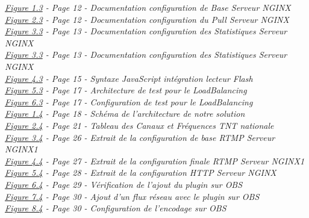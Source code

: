 \documentclass{report}
\begin{document}
\textit{\underline{Figure 1.3} - Page 12 - Documentation configuration de Base Serveur NGINX}
\\


\textit{\underline{Figure 2.3} - Page 12 - Documentation configuration du Pull Serveur NGINX}
\\


\textit{\underline{Figure 3.3} - Page 13 - Documentation configuration des Statistiques Serveur NGINX}
\\

\textit{\underline{Figure 3.3} - Page 13 - Documentation configuration des Statistiques Serveur NGINX}
\\

\textit{\underline{Figure 4.3} - Page 15 - Syntaxe JavaScript intégration lecteur Flash}
\\

\textit{\underline{Figure 5.3} - Page 17 - Architecture de test pour le LoadBalancing}
\\

\textit{\underline{Figure 6.3} - Page 17 - Configuration de test pour le LoadBalancing}
\\

\textit{\underline{Figure 1.4} - Page 18 - Schéma de l'architecture de notre solution}
\\

\textit{\underline{Figure 2.4} - Page 21 - Tableau des Canaux et Fréquences TNT nationale}
\\

\textit{\underline{Figure 3.4} - Page 26 - Extrait de la configuration de base RTMP Serveur NGINX1}
\\

\textit{\underline{Figure 4.4} - Page 27 - Extrait de la configuration finale RTMP Serveur NGINX1}
\\

\textit{\underline{Figure 5.4} - Page 28 - Extrait de la configuration HTTP Serveur NGINX}
\\

\textit{\underline{Figure 6.4} - Page 29 - Vérification de l'ajout du plugin sur OBS}
\\

\textit{\underline{Figure 7.4} - Page 30 - Ajout d'un flux réseau avec le plugin sur OBS}
\\

\textit{\underline{Figure 8.4} - Page 30 - Configuration de l'encodage sur OBS}
\\
\end{document}
